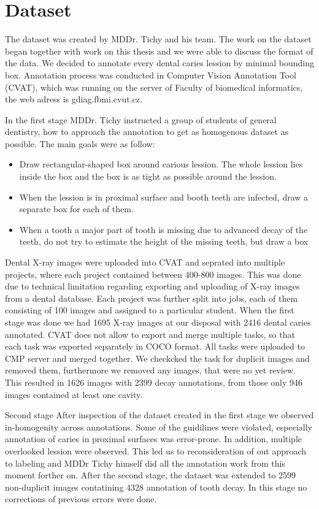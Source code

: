 \chapter{Dataset}
The dataset was created by MDDr. Tichy and his team. The work on the dataset began together with work on this thesis and we were able to discuss the format of the data. We decided to annotate every dental caries lession by minimal bounding box. Annotation process was conducted in Computer Vision Annotation Tool (CVAT), which was running on the server of Faculty of biomedical informatics, the web adress is gdiag.fbmi.cvut.cz.

In the first stage MDDr. Tichy instructed a group of students of general dentistry, how to approach the annotation to get as homogenous dataset as possible. The main goals were as follow:
\begin{itemize}
    \item Draw rectangular-shaped box around carious lession. The whole lession lies inside the box and the box is as tight as possible around the lession.
    \item When the lession is in proximal surface and booth teeth are infected, draw a separate box for each of them.
    \item When a tooth a major part of tooth is missing due to advanced decay of the teeth, do not try to estimate the height of the missing teeth, but draw a box
\end{itemize}
Dental X-ray images were uploaded into CVAT and seprated into multiple projects, where each project contained between 400-800 images. This was done due to technical limitation regarding exporting and uploading of X-ray images from a dental database. Each project was further split into jobs, each of them consisting of 100 images and assigned to a particular student. When the first stage was done we had 1695 X-ray images at our disposal with 2416 dental caries annotated. CVAT does not allow to export and merge multiple tasks, so that each task was exported separately in COCO format. All tasks were uploaded to CMP server and merged together. We checkcked the task for duplicit images and removed them, furthermore we removed any images, that were no yet review. This resulted in 1626 images with 2399 decay annotations, from those only 946 images contained at least one cavity.


Second stage
After inspection of the dataset created in the first stage we observed in-homogenity across annotations. Some of the guidilines were violated, especially annotation of caries in proximal surfaces was error-prone. In addition, multiple overlooked lession were observed. This led us to reconsideration of out approach to labeling and MDDr Tichy himself did all the annotation work from this moment forther on. After the second stage, the dataset was extended to 2599 non-duplicit images contatining 4328 annotation of tooth decay. In this stage no corrections of previous errors were done.


